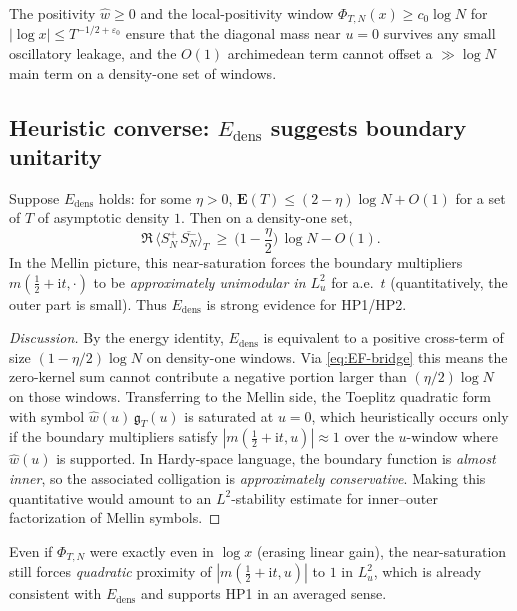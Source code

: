 \begin{remark}
The positivity $\widehat{w}\ge 0$ and the local-positivity window
$\Phi_{T,N}(x)\ge c_0\log N$ for $|\log x|\le T^{-1/2+\varepsilon_0}$ ensure that the diagonal
mass near $u=0$ survives any small oscillatory leakage, and the $O(1)$ archimedean term
cannot offset a $\gg\log N$ main term on a density-one set of windows.
\end{remark}

\subsection*{Heuristic converse: $E_{\mathrm{dens}}$ suggests boundary unitarity}

\begin{proposition}[Heuristic]
\label{prop:Edens-to-HP1-heuristic}
Suppose $E_{\mathrm{dens}}$ holds: for some $\eta>0$,
$\mathbf{E}(T)\le (2-\eta)\log N + O(1)$ for a set of $T$ of asymptotic density $1$.
Then on a density-one set,
\[
\Re\,\big\langle S_N^+\,\overline{S_N^-}\big\rangle_T
\ \ge\ \Big(1-\frac{\eta}{2}\Big)\,\log N - O(1).
\]
In the Mellin picture, this near-saturation forces the boundary multipliers
$m(\tfrac12+\mathrm{i}t,\cdot)$ to be \emph{approximately unimodular in $L^2_u$} for a.e.\ $t$
(quantitatively, the outer part is small). Thus $E_{\mathrm{dens}}$ is strong evidence for HP1/HP2.
\end{proposition}

\begin{proof}[Discussion]
By the energy identity, $E_{\mathrm{dens}}$ is equivalent to a positive cross-term of size
$(1-\eta/2)\log N$ on density-one windows. Via \eqref{eq:EF-bridge} this means the zero-kernel
sum cannot contribute a negative portion larger than $(\eta/2)\log N$ on those windows.
Transferring to the Mellin side, the Toeplitz quadratic form with symbol
$\widehat{w}(u)\,\mathfrak{g}_T(u)$ is saturated at $u=0$, which heuristically occurs only if
the boundary multipliers satisfy $|m(\tfrac12+\mathrm{i}t,u)|\approx 1$ over the $u$-window where
$\widehat{w}(u)$ is supported. In Hardy-space language, the boundary function is \emph{almost inner},
so the associated colligation is \emph{approximately conservative}. Making this quantitative would
amount to an $L^2$-stability estimate for inner--outer factorization of Mellin symbols.
\end{proof}

\begin{remark}
Even if $\Phi_{T,N}$ were exactly even in $\log x$ (erasing linear gain), the near-saturation still
forces \emph{quadratic} proximity of $|m(\tfrac12+\mathrm{i}t,u)|$ to $1$ in $L^2_u$, which is already
consistent with $E_{\mathrm{dens}}$ and supports HP1 in an averaged sense.
\end{remark}



